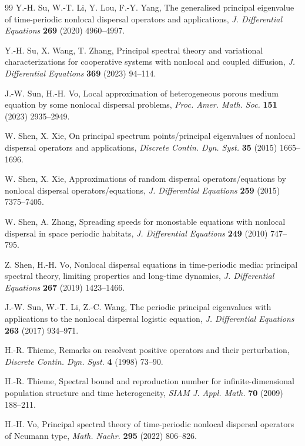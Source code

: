 \documentclass[11pt,reqno]{amsart}
\numberwithin{equation}{section}
\begin{document}
\begin{thebibliography}{99}
 Y.-H. Su, W.-T. Li, Y. Lou, F.-Y. Yang, The generalised principal eigenvalue of time-periodic nonlocal dispersal operators and applications, \emph{J. Differential Equations} {\bf 269} (2020) 4960--4997.

Y.-H. Su, X. Wang, T. Zhang, Principal spectral theory and variational
characterizations for cooperative systems with nonlocal and coupled diffusion, \emph{J. Differential Equations} {\bf 369} (2023) 94--114.

 J.-W. Sun, H.-H. Vo, Local approximation of heterogeneous porous medium equation by some nonlocal dispersal problems, \emph{Proc. Amer. Math. Soc.} {\bf 151} (2023) 2935--2949.


 W. Shen, X. Xie, On principal spectrum points/principal eigenvalues of nonlocal dispersal operators and applications, \emph{Discrete Contin. Dyn. Syst.} {\bf 35} (2015) 1665--1696.

  W. Shen, X. Xie,  Approximations of random dispersal operators/equations by nonlocal dispersal operators/equations, \emph{J. Differential Equations} {\bf 259} (2015) 7375--7405.

W. Shen, A. Zhang, Spreading speeds for monostable equations with nonlocal dispersal in space periodic habitats, \emph{J. Differential Equations} {\bf 249} (2010) 747--795.

Z. Shen, H.-H. Vo,  Nonlocal dispersal equations in time-periodic media: principal spectral theory, limiting properties and long-time dynamics, \emph{J. Differential Equations} {\bf 267} (2019) 1423--1466.

J.-W. Sun, W.-T. Li, Z.-C. Wang, The periodic principal eigenvalues with applications to the nonlocal dispersal
logistic equation, \emph{J. Differential Equations} {\bf 263} (2017) 934--971.


 H.-R. Thieme, Remarks on resolvent positive operators and their perturbation, \emph{Discrete Contin. Dyn. Syst.} {\bf 4} (1998) 73--90.

 H.-R. Thieme, Spectral bound and reproduction number for infinite-dimensional population structure and time heterogeneity, \emph{SIAM J. Appl. Math.} {\bf 70} (2009) 188--211.


H.-H. Vo,  Principal spectral theory of time-periodic nonlocal dispersal operators of Neumann type, \emph{Math. Nachr.} {\bf 295} (2022) 806--826.




\end{thebibliography}
\end{document}
